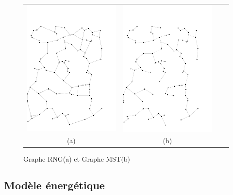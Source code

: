 \begin{figure}[tb]
    \centering
    \begin{tabular}{cccc}
      
      \includegraphics[angle=90, scale= 0.5,width=.5\linewidth]{Etat_de_l'art/source/GrapheRNG.pdf} &
      \includegraphics[angle=90, scale= 0.5,width=.5\linewidth]{Etat_de_l'art/source/GrapheMST.pdf} 
   \\
      (a) & (b) \\
    \end{tabular}
    \caption{Graphe RNG(a) et Graphe MST(b) \label{fig:ex}}
\end{figure}


\subsection{Modèle énergétique}
